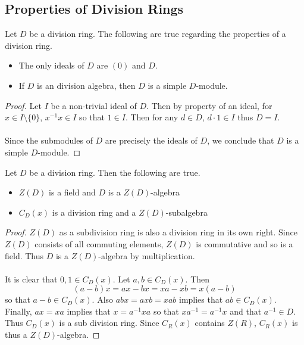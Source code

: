 \documentclass[a4paper]{article}
\begin{document}
\subsection{Properties of Division Rings}
\begin{prp}{}{} Let $D$ be a division ring. The following are true regarding the properties of a division ring. 
\begin{itemize}
\item The only ideals of $D$ are $(0)$ and $D$. 
\item If $D$ is an division algebra, then $D$ is a simple $D$-module. 
\end{itemize} \tcbline
\begin{proof}
Let $I$ be a non-trivial ideal of $D$. Then by property of an ideal, for $x\in I\setminus\{0\}$, $x^{-1}x\in I$ so that $1\in I$. Then for any $d\in D$, $d\cdot 1\in I$ thus $D=I$. \\~\\

Since the submodules of $D$ are precisely the ideals of $D$, we conclude that $D$ is a simple $D$-module. 
\end{proof}
\end{prp}

\begin{lmm}{}{} Let $D$ be a division ring. Then the following are true. 
\begin{itemize}
\item $Z(D)$ is a field and $D$ is a $Z(D)$-algebra
\item $C_D(x)$ is a division ring and a $Z(D)$-subalgebra
\end{itemize} \tcbline
\begin{proof}
$Z(D)$ as a subdivision ring is also a division ring in its own right. Since $Z(D)$ consists of all commuting elements, $Z(D)$ is commutative and so is a field. Thus $D$ is a $Z(D)$-algebra by multiplication. \\~\\

It is clear that $0,1\in C_D(x)$. Let $a,b\in C_D(x)$. Then $$(a-b)x=ax-bx=xa-xb=x(a-b)$$ so that $a-b\in C_D(x)$. Also $abx=axb=xab$ implies that $ab\in C_D(x)$. Finally, $ax=xa$ implies that $x=a^{-1}xa$ so that $xa^{-1}=a^{-1}x$ and that $a^{-1}\in D$. Thus $C_D(x)$ is a sub division ring. Since $C_R(x)$ contains $Z(R)$, $C_R(x)$ is thus a $Z(D)$-algebra. 
\end{proof}
\end{lmm}
\end{document}
